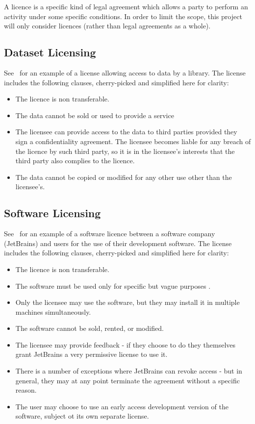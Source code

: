 A licence is a specific kind of legal agreement which allows a party to perform an activity under some specific
conditions\cite{licenseDefinition}.
In order to limit the scope, this project will only consider licences (rather than legal agreements as a whole).

\subsection{Dataset Licensing}\label{subsec:licensing:dataset}
See~\cite{seismicDataLicence} for an example of a license allowing access to data by a library.
The license includes the following clauses, cherry-picked and simplified here for clarity:
\begin{itemize}
    \item The licence is non transferable.
    \item The data cannot be sold or used to provide a service
    \item The licensee can provide access to the data to third parties provided they sign a confidentiality agreement.
    The licensee becomes liable for any breach of the licence by such third party, so it is in the licensee's interests
    that the third party also complies to the licence.
    \item The data cannot be copied or modified for any other use other than the licensee's.
\end{itemize}

\subsection{Software Licensing}\label{subsec:licensing:software}
See~\cite{jetbrainsEduLicence} for an example of a software licence between a software company (JetBrains) and users for
the use of their development software.
The license includes the following clauses, cherry-picked and simplified here for clarity:
\begin{itemize}
    \item The licence is non transferable.
    \item The software must be used only for specific but vague purposes \textcite[for non-commercial, educational purposes
    only]{jetbrainsEduLicence}.
    \item Only the licensee may use the software, but they may install it in multiple machines simultaneously.
    \item The software cannot be sold, rented, or modified.
    \item The licensee may provide feedback - if they choose to do they themselves grant JetBrains a very permissive
    license to use it.
    \item There is a number of exceptions where JetBrains can revoke access - but in general, they may at any point
    terminate the agreement without a specific reason.
    \item The user may choose to use an early access development version of the software, subject ot its own separate
    license.
\end{itemize}


